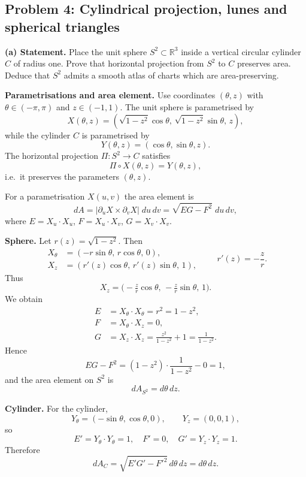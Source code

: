 \documentclass[12pt,a4paper]{article}
\theoremstyle{plain}
\theoremstyle{definition}      %
\begin{document}
\subsection*{Problem 4: Cylindrical projection, lunes and spherical triangles}

\textbf{(a) Statement.}
Place the unit sphere $S^{2}\subset\mathbb{R}^{3}$ inside a vertical
circular cylinder $C$ of radius one. Prove that horizontal projection
from $S^{2}$ to $C$ preserves area. Deduce that $S^{2}$ admits a smooth
atlas of charts which are area-preserving.

\medskip
\textbf{Parametrisations and area element.}
Use coordinates $(\theta,z)$ with
$\theta\in(-\pi,\pi)$ and $z\in(-1,1)$.
The unit sphere is parametrised by
\[
X(\theta,z)
=(\sqrt{1-z^{2}}\cos\theta,\,
\sqrt{1-z^{2}}\sin\theta,\,
z),
\]
while the cylinder $C$ is parametrised by
\[
Y(\theta,z) = (\cos\theta,\sin\theta,z).
\]
The horizontal projection
$\Pi:S^{2}\to C$ satisfies
\[
\Pi\circ X(\theta,z)=Y(\theta,z),
\]
i.e.\ it preserves the parameters $(\theta,z)$.

For a parametrisation $X(u,v)$ the area element is
\[
dA = |\partial_u X \times \partial_v X|\;du\,dv
= \sqrt{EG-F^{2}}\;du\,dv,
\]
where $E=X_u\cdot X_u$, $F=X_u\cdot X_v$, $G=X_v\cdot X_v$.

\medskip
\textbf{Sphere.}
Let $r(z)=\sqrt{1-z^{2}}$. Then
\[
\begin{aligned}
	X_\theta &= (-r\sin\theta,\,r\cos\theta,\,0),\\
	X_z &= (r'(z)\cos\theta,\,r'(z)\sin\theta,\,1),
\end{aligned}
\qquad r'(z)=-\frac{z}{r}.
\]
Thus
\[
X_z = \bigl(-\tfrac{z}{r}\cos\theta,\,
-\tfrac{z}{r}\sin\theta,\,
1\bigr).
\]
We obtain
\[
\begin{aligned}
	E &= X_\theta\cdot X_\theta = r^{2}=1-z^{2},\\
	F &= X_\theta\cdot X_z = 0,\\
	G &= X_z\cdot X_z = \frac{z^{2}}{1-z^{2}} + 1
	= \frac{1}{1-z^{2}}.
\end{aligned}
\]
Hence
\[
EG-F^{2} = (1-z^{2})\cdot\frac{1}{1-z^{2}} - 0 = 1,
\]
and the area element on $S^{2}$ is
\[
dA_{S^{2}} = d\theta\,dz.
\]

\medskip
\textbf{Cylinder.}
For the cylinder,
\[
Y_\theta = (-\sin\theta,\cos\theta,0),\qquad
Y_z = (0,0,1),
\]
so
\[
E' = Y_\theta\cdot Y_\theta = 1,\quad
F' = 0,\quad
G' = Y_z\cdot Y_z = 1.
\]
Therefore
\[
dA_C = \sqrt{E'G'-F'^{2}}\,d\theta\,dz = d\theta\,dz.
\]
\end{document}
